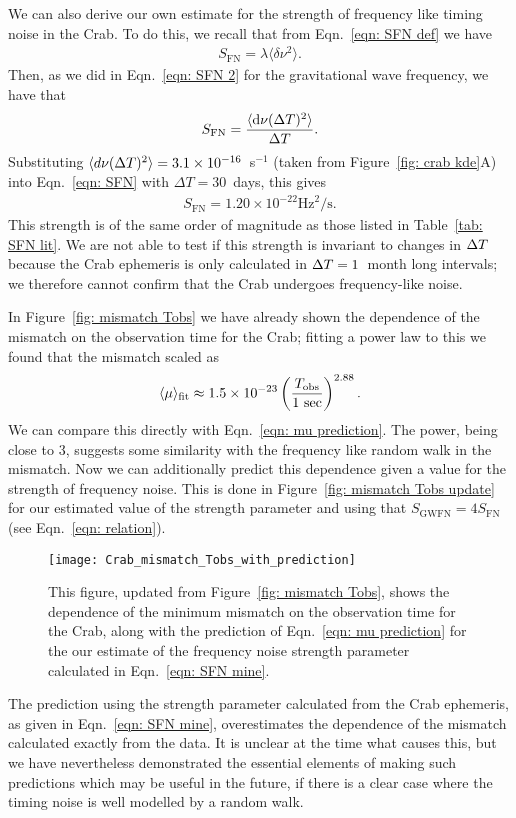 \documentclass[../full_thesis/full_thesis.tex]{subfiles}
\begin{document}
We can also derive our own estimate for the strength of frequency like timing noise
in the Crab. To do this, we recall that from Eqn.~\eqref{eqn: SFN def} we have
\begin{align}
S_{\textrm{FN}} = \lambda \langle \delta \nu^{2}\rangle.
\end{align}
Then, as we did in Eqn.~\eqref{eqn: SFN 2} for the gravitational wave frequency,
we have that
\begin{align}
S_{\textrm{FN}} = \frac{\langle \mathrm{d} \nu(\Delta T)^{2} \rangle }{\Delta T}.
\label{eqn: SFN}
\end{align}
Substituting
$\langle d\nu(\Delta T)^2 \rangle =3.1\times10^{-16}$~s$^{-1}$ (taken from Figure~\ref{fig: crab
kde}A) into Eqn.~\eqref{eqn: SFN} with $\Delta T = 30$~days, this gives
\begin{align}
S_{\mathrm{FN}} = 1.20 \times 10^{-22} \textrm{Hz}^{2}/\textrm{s}.
\label{eqn: SFN mine}
\end{align}
This strength is of the
same order of magnitude as those listed in Table~\ref{tab: SFN lit}. We are not
able to test if this strength is invariant to changes in $\Delta T$ because the
Crab ephemeris is only calculated in $\Delta T=1$~month long intervals; we therefore
cannot confirm that the Crab undergoes frequency-like noise.

In Figure~\ref{fig: mismatch Tobs} we have already shown the dependence of the
mismatch on the observation time for the Crab; fitting a power law to this
we found that the mismatch scaled as
\begin{align}
\langle \mu \rangle_{\textrm{fit}} \approx 1.5 \times 10^{-23}
\left(\frac{T_{\mathrm{obs}}}{1 \textrm{ sec}}\right)^{2.88}.
\end{align}
We can compare this directly with Eqn.~\eqref{eqn: mu prediction}. The power,
being close to $3$, suggests some similarity with the frequency like random
walk in the mismatch.  Now we can additionally predict this dependence given a
value for the strength of frequency noise. This is done in Figure~\ref{fig:
mismatch Tobs update} for our estimated value of the strength parameter and
using that $S_{\textrm{GWFN}} = 4S_\textrm{FN}$ (see Eqn.~\eqref{eqn:
relation}).
\begin{figure}[htb]
\centering
\texttt{[image: Crab\_mismatch\_Tobs\_with\_prediction]}
\caption{This figure, updated from Figure~\ref{fig: mismatch Tobs}, shows the
dependence of the minimum mismatch on the observation time for the Crab, along
with the prediction of Eqn.~\eqref{eqn: mu prediction} for the our estimate of
the frequency noise strength parameter calculated in Eqn.~\eqref{eqn: SFN mine}.}
\label{fig: mismatch Tobs update}
\end{figure}
The prediction using the strength parameter calculated from the Crab ephemeris,
as given in Eqn.~\eqref{eqn: SFN mine}, overestimates the dependence of the
mismatch calculated exactly from the data. It is unclear at the time what
causes this, but we have nevertheless
demonstrated the essential elements of making such predictions which may be useful
in the future, if there is a clear case where the timing noise is well
modelled by a random walk.
\end{document}
